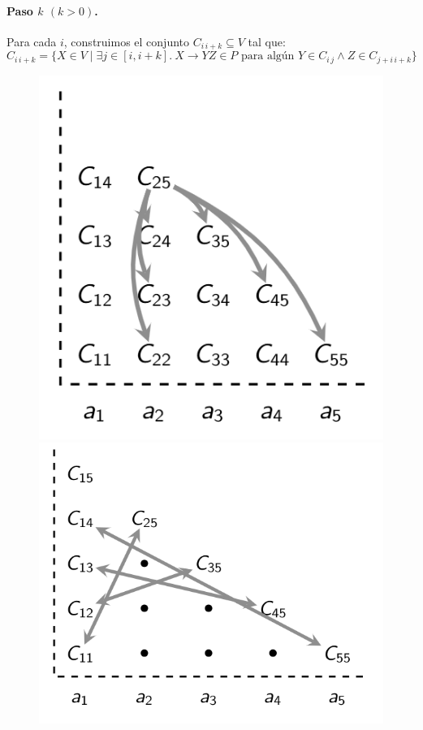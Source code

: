 \paragraph{Paso $k$ $(k > 0)$.} Para cada $i$, construimos el conjunto $C_{i\, i+k} \subseteq V$ tal que:
$$
    C_{i\, i+k} = \{ X \in V \mid \exists j \in [i,i+k].\ X \to YZ \in P \text{ para algún } Y \in C_{i\, j} \wedge Z \in C_{j+i \, i+k}\}
$$
\begin{figure}[H]
    \centering
    \includegraphics[scale=0.35]{img/cap4/cky4.png}
    \includegraphics[scale=0.35]{img/cap4/cky5.png}
\end{figure}

